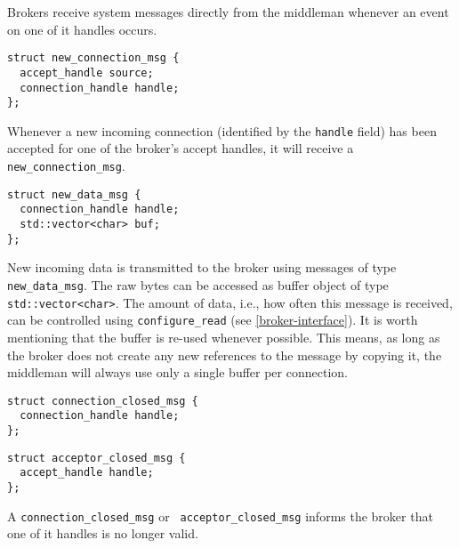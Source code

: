 Brokers receive system messages directly from the middleman whenever an event on one of it handles occurs.

\begin{lstlisting}
struct new_connection_msg {
  accept_handle source;
  connection_handle handle;
};
\end{lstlisting}

Whenever a new incoming connection (identified by the \lstinline^handle^ field) has been accepted for one of the broker's accept handles, it will receive a \lstinline^new_connection_msg^.

\begin{lstlisting}
struct new_data_msg {
  connection_handle handle;
  std::vector<char> buf;
};
\end{lstlisting}

New incoming data is transmitted to the broker using messages of type \lstinline^new_data_msg^.
The raw bytes can be accessed as buffer object of type \lstinline^std::vector<char>^.
The amount of data, i.e., how often this message is received, can be controlled using \lstinline^configure_read^ (see \ref{broker-interface}).
It is worth mentioning that the buffer is re-used whenever possible.
This means, as long as the broker does not create any new references to the message by copying it, the middleman will always use only a single buffer per connection.

\begin{lstlisting}
struct connection_closed_msg {
  connection_handle handle;
};
\end{lstlisting}

\begin{lstlisting}
struct acceptor_closed_msg {
  accept_handle handle;
};
\end{lstlisting}


A \lstinline^connection_closed_msg^ or \lstinline^ acceptor_closed_msg^ informs the broker that one of it handles is no longer valid.
